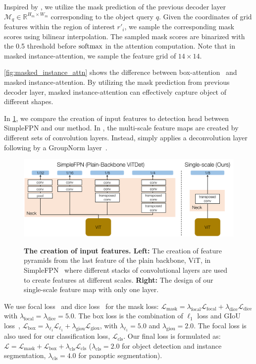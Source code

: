 Inspired by \cite{cheng2022mask2former}, we utilize the mask prediction of the previous decoder layer $\mathcal{M}_q \in \mathbb{R}^{H_m \times W_m}$ corresponding to the object query $q$. Given the coordinates of grid features within the region of interest $r'_i$, we sample the corresponding mask scores using bilinear interpolation. The sampled mask scores are binarized with the 0.5 threshold before $\mathrm{softmax}$ in the attention computation. Note that in masked instance-attention, we sample the feature grid of $14\times14$.

\cref{fig:masked_instance_attn} shows the difference between box-attention~\citep{nguyen2022boxer} and masked instance-attention. By utilizing the mask prediction from previous decoder layer, masked instance-attention can effectively capture object of different shapes.


 In \cref{fig:fpn_vs_ss}, we compare the creation of input features to detection head between SimpleFPN and our method. In \cite{li2022vitdet}, the multi-scale feature maps are created by different sets of convolution layers. Instead, \ours simply applies a deconvolution layer following by a GroupNorm layer~\citep{wu2018groupnorm}.


\begin{figure}[t]
    \centering
    \includegraphics[width=0.8\linewidth]{fig/fpn_vs_ss_w_neck.pdf}\\
    \caption{
        \textbf{The creation of input features. Left:} The creation of feature pyramids from the last feature of the plain backbone, ViT, in SimpleFPN~\citep{li2022vitdet} where different stacks of convolutional layers are used to create features at different scales. \textbf{Right:} The design of our single-scale feature map with only one layer.
    }
    \label{fig:fpn_vs_ss}
\end{figure}

 We use focal loss~\citep{lin2017focalloss} and dice loss~\citep{milletari2016vnet} for the mask loss: $\mathcal{L}_\text{mask} = \lambda_\text{focal}\mathcal{L}_\text{focal} + \lambda_\text{dice}\mathcal{L}_\text{dice}$ with $\lambda_\text{focal}=\lambda_\text{dice}=5.0$. The box loss is the combination of $\ell_1$ loss and GIoU loss~\citep{rezatofighi2019giou}, $\mathcal{L}_\text{box} = \lambda_{\ell_1}\mathcal{L}_{\ell_1} + \lambda_\text{giou}\mathcal{L}_\text{giou}$, with $\lambda_{\ell_1} = 5.0$ and $\lambda_\text{giou} = 2.0$. The focal loss is also used for our classification loss, $\mathcal{L}_\text{cls}$. Our final loss is formulated as: $\mathcal{L} = \mathcal{L}_\text{mask} + \mathcal{L}_\text{box} + \lambda_\text{cls}\mathcal{L}_\text{cls}$ ($\lambda_\text{cls} = 2.0$ for object detection and instance segmentation, $\lambda_\text{cls} = 4.0$ for panoptic segmentation).


